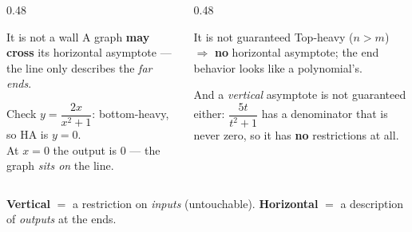 \documentclass[aspectratio=169, 11pt]{beamer}
\begin{document}
\begin{frame}[t, plain]
  \begin{columns}[T]
    \begin{column}{0.48\textwidth}
      \begin{block}{It is not a wall}
        A graph \textbf{may cross} its horizontal asymptote --- the line only describes the
        \emph{far ends}.
      \end{block}
      \vspace{3pt}
      {\footnotesize Check $y=\dfrac{2x}{x^2+1}$: bottom-heavy, so HA is $y=0$. \\[3pt]
      At $x=0$ the output is $0$ --- the graph \emph{sits on} the line.}
    \end{column}
    \begin{column}{0.48\textwidth}
      \begin{block}{It is not guaranteed}
        Top-heavy ($n>m$) $\Rightarrow$ \textbf{no} horizontal asymptote; the end behavior looks like a
        polynomial's.
      \end{block}
      \vspace{3pt}
      {\footnotesize And a \emph{vertical} asymptote is not guaranteed either: $\dfrac{5t}{t^2+1}$ has
      a denominator that is never zero, so it has \textbf{no} restrictions at all.}
    \end{column}
  \end{columns}
  \vspace{6pt}
  \begin{center}
    \textbf{Vertical} $=$ a restriction on \emph{inputs} (untouchable). \quad
    \textbf{Horizontal} $=$ a description of \emph{outputs} at the ends.
  \end{center}
\end{frame}
\end{document}
